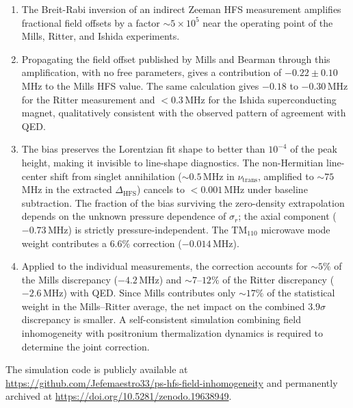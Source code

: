 \documentclass[twocolumn,pra,aps,superscriptaddress,floatfix,10pt]{revtex4-2}
\begin{document}
\begin{enumerate}
  \item[(i)] The Breit-Rabi inversion of an indirect Zeeman HFS measurement amplifies fractional field offsets by a factor $\sim 5 \times 10^5$ near the operating point of the Mills, Ritter, and Ishida experiments.

  \item[(ii)] Propagating the field offset published by Mills and Bearman through this amplification, with no free parameters, gives a contribution of $-0.22 \pm 0.10$\,MHz to the Mills HFS value. The same calculation gives $-0.18$ to $-0.30$\,MHz for the Ritter measurement and $< 0.3$\,MHz for the Ishida superconducting magnet, qualitatively consistent with the observed pattern of agreement with QED.

  \item[(iii)] The bias preserves the Lorentzian fit shape to better than $10^{-4}$ of the peak height, making it invisible to line-shape diagnostics. The non-Hermitian line-center shift from singlet annihilation ($\sim 0.5$\,MHz in $\nu_\mathrm{trans}$, amplified to $\sim 75$\,MHz in the extracted $\Delta_\mathrm{HFS}$) cancels to $< 0.001$\,MHz under baseline subtraction. The fraction of the bias surviving the zero-density extrapolation depends on the unknown pressure dependence of $\sigma_r$; the axial component ($-0.73$\,MHz) is strictly pressure-independent. The TM$_{110}$ microwave mode weight contributes a $6.6\%$ correction ($-0.014$\,MHz).

  \item[(iv)] Applied to the individual measurements, the correction accounts for $\sim 5\%$ of the Mills discrepancy ($-4.2$\,MHz) and $\sim 7$--$12\%$ of the Ritter discrepancy ($-2.6$\,MHz) with QED. Since Mills contributes only $\sim 17\%$ of the statistical weight in the Mills--Ritter average, the net impact on the combined $3.9\sigma$ discrepancy is smaller. A self-consistent simulation combining field inhomogeneity with positronium thermalization dynamics is required to determine the joint correction.
\end{enumerate}

\begin{acknowledgments}
The simulation code is publicly available at \url{https://github.com/Jefemaestro33/ps-hfs-field-inhomogeneity} and permanently archived at \url{https://doi.org/10.5281/zenodo.19638949}.
\end{acknowledgments}


\end{document}
